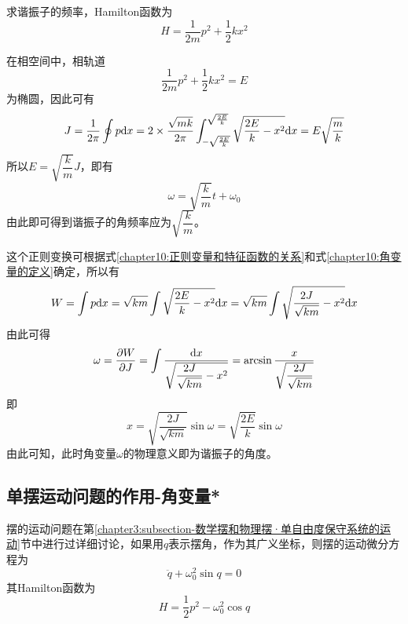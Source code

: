 \begin{example}
求谐振子的频率，Hamilton函数为
\begin{equation*}
	H = \frac{1}{2m}p^2 + \frac12 kx^2
\end{equation*}
\end{example}
\begin{solution}
在相空间中，相轨道
\begin{equation*}
	\frac{1}{2m}p^2 + \frac12 kx^2 = E
\end{equation*}
为椭圆，因此可有
\begin{equation*}
	J = \frac{1}{2\pi} \oint p\mathrm{d} x = 2\times\frac{\sqrt{mk}}{2\pi} \int_{-\sqrt{\frac{2E}{k}}}^{\sqrt{\frac{2E}{k}}} \sqrt{\frac{2E}{k}-x^2}\mathrm{d} x = E\sqrt{\frac{m}{k}}
\end{equation*}
所以$E = \sqrt{\dfrac{k}{m}}J$，即有
\begin{equation*}
	\omega = \sqrt{\dfrac{k}{m}} t + \omega_0
\end{equation*}
由此即可得到谐振子的角频率应为$\sqrt{\dfrac{k}{m}}$。

这个正则变换可根据式\eqref{chapter10:正则变量和特征函数的关系}和式\eqref{chapter10:角变量的定义}确定，所以有
\begin{equation*}
	W = \int p\mathrm{d} x = \sqrt{km} \int \sqrt{\frac{2E}{k}-x^2}\mathrm{d} x = \sqrt{km} \int \sqrt{\frac{2J}{\sqrt{km}}-x^2}\mathrm{d} x
\end{equation*}
由此可得
\begin{equation*}
	\omega = \frac{\partial W}{\partial J} = \int \frac{\mathrm{d} x}{\sqrt{\dfrac{2J}{\sqrt{km}}-x^2}} = \arcsin \frac{x}{\sqrt{\dfrac{2J}{\sqrt{km}}}}
\end{equation*}
即
\begin{equation*}
	x = \sqrt{\dfrac{2J}{\sqrt{km}}}\sin \omega = \sqrt{\frac{2E}{k}} \sin \omega
\end{equation*}
由此可知，此时角变量$\omega$的物理意义即为谐振子的角度。
\end{solution}

\subsection{单摆运动问题的作用-角变量*}

摆的运动问题在第\ref{chapter3:subsection-数学摆和物理摆·单自由度保守系统的运动}节中进行过详细讨论，如果用$q$表示摆角，作为其广义坐标，则摆的运动微分方程为
\begin{equation}
	\ddot{q} + \omega_0^2 \sin q = 0
\end{equation}
其Hamilton函数为
\begin{equation}
	H = \frac12 p^2 - \omega_0^2 \cos q
\end{equation}

